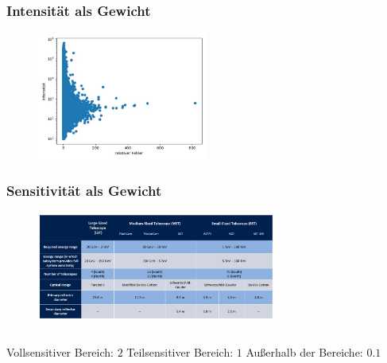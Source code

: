 \documentclass[aspectratio=1610, professionalfonts, 9pt]{beamer}
\begin{document}
  \begin{frame}
    \frametitle{Intensität als Gewicht}
    \begin{figure}
      \includegraphics[width=0.5\textwidth]{pictures/intensity.jpg}
      \caption{}
      \label{}
    \end{figure}
  \end{frame}

  \begin{frame}
    \frametitle{Sensitivität als Gewicht}
    \begin{figure}
      \includegraphics[width=0.7\textwidth]{pictures/Spec.JPG}
      \caption{\cite{spec}}
      \label{}
    \end{figure}
    \begin{columns}
      Vollsensitiver Bereich: $\num{2}$
      Teilsensitiver Bereich: $\num{1}$
       Außerhalb der Bereiche: $\num{0.1}$
    \end{columns}
  \end{frame}
\end{document}
